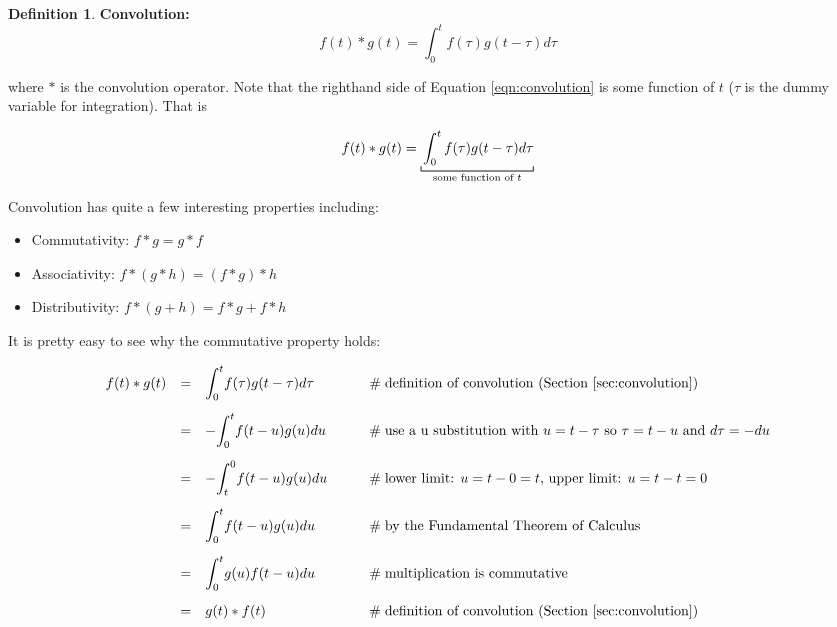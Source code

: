 \documentclass{article}
\theoremstyle{definition}
\newtheorem{definition}{Definition}[section]
\begin{document}
\bigskip
\begin{definition} {\bf Convolution:}
\bigskip
\begin{equation}
f(t) \ast g(t) = \int^t_0 f(\tau) g(t - \tau) d\tau
\label{eqn:convolution}
\end{equation}
\label{def:convolution}
\end{definition}

\noindent
where $\ast$ is the convolution operator. Note that the righthand
side of Equation \ref{eqn:convolution} is some function of $t$
($\tau$ is the dummy variable for integration). That is

\bigskip
\begin{equation*}
f(t) \ast g(t) = \underbracket [0.15 ex] {\strut \int^t_0 f(\tau) g(t - \tau) d\tau}_{\text{some function of } t}
\end{equation*}

\bigskip
\noindent
Convolution has quite a few interesting properties including:

\bigskip
 \begin{itemize}
 \item Commutativity: $f \ast g = g \ast f$ 
 \item Associativity: $f \ast (g \ast h) = (f \ast g) \ast h$
 \item Distributivity:  $f \ast (g + h) = f \ast g + f \ast h$
\end{itemize}

\bigskip
\noindent
It is pretty easy to see why the commutative property holds:

\begin{equation*}
\begin{array}{lllll}
f(t) \ast g(t)                                                                                                                          
&=& \mathlarger{\int}^t_0 f(\tau) g(t - \tau) d\tau                  &\qquad \mathrel{\#} \text{definition of convolution (Section \ref{sec:convolution})}                                 \\
[15pt]
&=& -\mathlarger{\int}^t_0 f(t -u) g(u) du                              &\qquad \mathrel{\#} \text{use a u substitution with $u = t - \tau$ so $\tau = t -u$ and $d\tau = -du$}     \\
[15pt]
&=& - \mathlarger{\int}^0_t f(t -u) g(u) du                             &\qquad \mathrel{\#} \text{lower limit: $u = t - 0 = t$, upper limit: $u = t - t = 0$}                                     \\
[15pt]
&=& \mathlarger{\int}^t_0 f(t -u) g(u) du                               &\qquad \mathrel{\#} \text{by the Fundamental Theorem of Calculus}                                                      \\
[15pt]
&=& \mathlarger{\int}^t_0 g(u) f(t -u) du                               &\qquad \mathrel{\#} \text{multiplication is commutative}                                                                          \\
[15pt]
&=& g(t) \ast f(t)                                                                    &\qquad \mathrel{\#} \text{definition of convolution (Section \ref{sec:convolution})}
\end{array}
\end{equation*}
\end{document}
